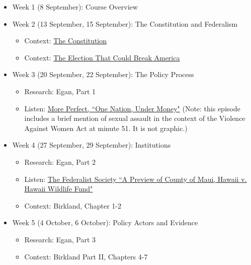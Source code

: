 \documentclass[12pt]{article}
\begin{document}
\begin{itemize}
\item Week 1 (8 September): Course Overview

\item Week 2 (13 September, 15 September): The Constitution and Federalism
\begin{itemize}
\item Context: \href{https://constitutioncenter.org/interactive-constitution/the-constitution}{The Constitution}
\item Context: \href{https://www.theatlantic.com/magazine/archive/2020/11/what-if-trump-refuses-concede/616424/}{The Election That Could Break America}
\end{itemize}

\item Week 3 (20 September, 22 September): The Policy Process
\begin{itemize}
\item Research: Egan, Part 1 
\item Listen: \href{https://www.wnycstudios.org/podcasts/radiolabmoreperfect/episodes/one-nation-under-money}{More Perfect, ``One Nation, Under Money"}  (Note: this episode includes a brief mention of sexual assault in the context of the Violence Against Women Act at minute 51. It is not graphic.)
\end{itemize}

\item Week 4 (27 September, 29 September): Institutions %
\begin{itemize}
\item Research: Egan, Part 2
\item Listen: \href{https://fedsoc.org/commentary/podcasts/deep-dive-episode-82-a-preview-of-county-of-maui-hawaii-v-hawaii-wildlife-fund}{The Federalist Society ``A Preview of County of Maui, Hawaii v. Hawaii Wildlife Fund"}
\item Context: Birkland, Chapter 1-2
\end{itemize}

\item Week 5 (4 October, 6 October): Policy Actors and Evidence
\begin{itemize}
\item Research: Egan, Part 3
\item Context: Birkland Part II, Chapters 4-7
\end{itemize}


\end{itemize}
\end{document}
